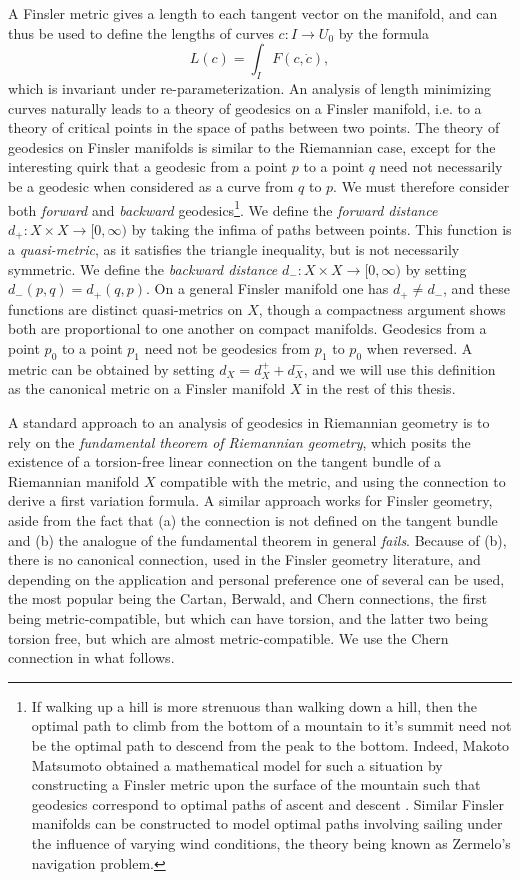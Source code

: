 A Finsler metric gives a length to each tangent vector on the manifold, and can thus be used to define the lengths of curves $c: I \to U_0$ by the formula
%
\begin{equation}
  L(c) = \int_I F(c,\dot{c}),
\end{equation}
%
which is invariant under re-parameterization. An analysis of length minimizing curves naturally leads to a theory of geodesics on a Finsler manifold, i.e. to a theory of critical points in the space of paths between two points. The theory of geodesics on Finsler manifolds is similar to the Riemannian case, except for the interesting quirk that a geodesic from a point $p$ to a point $q$ need not necessarily be a geodesic when considered as a curve from $q$ to $p$. We must therefore consider both \emph{forward} and \emph{backward} geodesics\footnote{If walking up a hill is more strenuous than walking down a hill, then the optimal path to climb from the bottom of a mountain to it's summit need not be the optimal path to descend from the peak to the bottom. Indeed, Makoto Matsumoto obtained a mathematical model for such a situation by constructing a Finsler metric upon the surface of the mountain such that geodesics correspond to optimal paths of ascent and descent \cite{Matsumoto}. Similar Finsler manifolds can be constructed to model optimal paths involving sailing under the influence of varying wind conditions, the theory being known as Zermelo's navigation problem.}. We define the \emph{forward distance} $d_+: X \times X \to [0,\infty)$ by taking the infima of paths between points. This function is a \emph{quasi-metric}, as it satisfies the triangle inequality, but is not necessarily symmetric. We define the \emph{backward distance} $d_-: X \times X \to [0,\infty)$ by setting $d_-(p,q) = d_+(q,p)$. On a general Finsler manifold one has $d_+ \neq d_-$, and these functions are distinct quasi-metrics on $X$, though a compactness argument shows both are proportional to one another on compact manifolds. Geodesics from a point $p_0$ to a point $p_1$ need not be geodesics from $p_1$ to $p_0$ when reversed. A metric can be obtained by setting $d_X = d_X^+ + d_X^-$, and we will use this definition as the canonical metric on a Finsler manifold $X$ in the rest of this thesis.

A standard approach to an analysis of geodesics in Riemannian geometry is to rely on the \emph{fundamental theorem of Riemannian geometry}, which posits the existence of a torsion-free linear connection on the tangent bundle of a Riemannian manifold $X$ compatible with the metric, and using the connection to derive a first variation formula. A similar approach works for Finsler geometry, aside from the fact that (a) the connection is not defined on the tangent bundle and (b) the analogue of the fundamental theorem in general \emph{fails}. Because of (b), there is no canonical connection, used in the Finsler geometry literature, and depending on the application and personal preference one of several can be used, the most popular being the Cartan, Berwald, and Chern connections, the first being metric-compatible, but which can have torsion, and the latter two being torsion free, but which are almost metric-compatible. We use the Chern connection in what follows.

